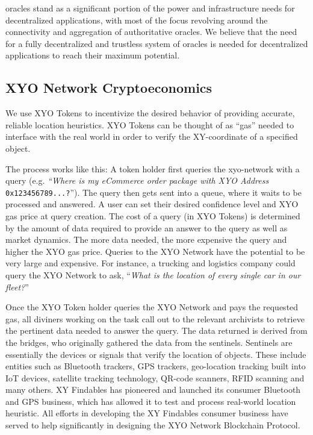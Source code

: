 \documentclass{article}
\begin{document}
\Glspl{oracle} stand as a significant portion of the power and infrastructure needs for decentralized applications, with most of the focus revolving around the connectivity and aggregation of authoritative oracles. We believe that the need for a fully decentralized and \gls{trustless} system of oracles is needed for decentralized applications to reach their maximum potential.


\subsection {XYO Network Cryptoeconomics}
We use XYO Tokens to incentivize the desired behavior of providing accurate, reliable location \glspl{heuristic}. XYO Tokens can be thought of as ``gas'' needed to interface with the real world in order to verify the XY-coordinate of a specified object.

The process works like this: A token holder first queries the \Gls{xyo-network} with a query (e.g. \textit{``Where is my eCommerce order package with XYO Address} \texttt{0x123456789...?}''). The query then gets sent into a queue, where it waits to be processed and answered. A user can set their desired confidence level and XYO gas price at query creation. The cost of a query (in XYO Tokens) is determined by the amount of data required to provide an answer to the query as well as market dynamics.  The more data needed, the more expensive the query and higher the XYO gas price. Queries to the XYO Network have the potential to be very large and expensive. For instance, a trucking and logistics company could query the XYO Network to ask, ``\textit{What is the location of every single car in our fleet?}''

Once the XYO Token holder queries the XYO Network and pays the requested gas, all \Glspl{diviner} working on the task call out to the relevant \Glspl{archivist} to retrieve the pertinent data needed to answer the query. The data returned is derived from the \Glspl{bridge}, who originally gathered the data from the \Glspl{sentinel}. Sentinels are essentially the devices or signals that verify the location of objects. These include entities such as Bluetooth trackers, GPS trackers, geo-location tracking built into IoT devices, satellite tracking technology, QR-code scanners, RFID scanning and many others. XY Findables has pioneered and launched its consumer Bluetooth and GPS business, which has allowed it to test and process real-world location heuristic. All efforts in developing the XY Findables consumer business have served to help significantly in designing the XYO Network Blockchain Protocol.
\end{document}
